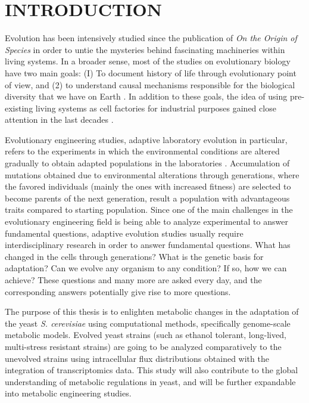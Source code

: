 \chapter{INTRODUCTION}
Evolution has been intensively studied since the publication of \emph{On the Origin of Species} in order to untie the mysteries behind fascinating machineries within living systems. In a broader sense, most of the studies on evolutionary biology have two main goals: (I) To document history of life through evolutionary point of view, and (2) to understand causal mechanisms responsible for the biological diversity that we have on Earth \cite{futuyma2001evolution, hird2017evolutionary}. In addition to these goals, the idea of using pre-existing living systems as cell factories for industrial purposes gained close attention in the last decades \cite{nielsen2016engineering}.

Evolutionary engineering studies, adaptive laboratory evolution in particular, refers to the experiments in which the environmental conditions are altered gradually to obtain adapted populations in the laboratories \cite{garland2009experimental}. Accumulation of mutations obtained due to environmental alterations through generations, where the favored individuals (mainly the ones with increased fitness) are selected to become parents of the next generation, result a population with advantageous traits compared to starting population. Since one of the main challenges in the evolutionary engineering field is being able to analyze experimental to answer fundamental questions, adaptive evolution studies usually require interdisciplinary research in order to answer fundamental questions. What has changed in the cells through generations? What is the genetic basis for adaptation? Can we evolve any organism to any condition? If so, how we can achieve? These questions and many more are asked every day, and the corresponding answers potentially give rise to more questions.

The purpose of this thesis is to enlighten metabolic changes in the adaptation of the yeast \emph{S. cerevisiae} using computational methods, specifically genome-scale metabolic models. Evolved yeast strains (such as ethanol tolerant, long-lived, multi-stress resistant strains) are going to be analyzed comparatively to the unevolved strains using intracellular flux distributions obtained with the integration of transcriptomics data. This study will also contribute to the global understanding of metabolic regulations in yeast, and will be further expandable into metabolic engineering studies.

